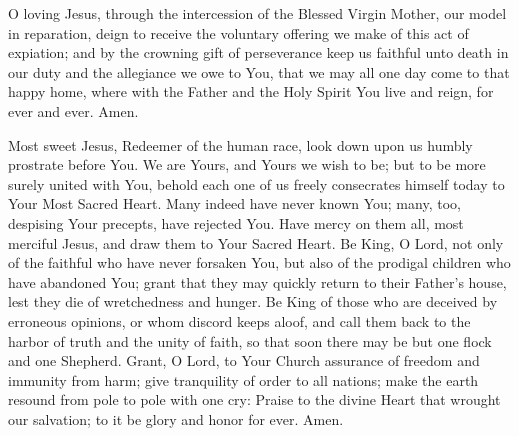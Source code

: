 O loving Jesus, through the intercession of the Blessed Virgin Mother, our model in reparation, deign to receive the voluntary offering we make of this act of expiation;
and by the crowning gift of perseverance keep us faithful unto death in our duty and the allegiance we owe to You, that we may all one day come to that happy home, where with the Father and the Holy Spirit You live and reign, for ever and ever. Amen.

Most sweet Jesus, Redeemer of the human race, look down upon us humbly prostrate before You.
We are Yours, and Yours we wish to be;
but to be more surely united with You, behold each one of us freely consecrates himself today to Your Most Sacred Heart.
Many indeed have never known You;
many, too, despising Your precepts, have rejected You.
Have mercy on them all, most merciful Jesus, and draw them to Your Sacred Heart.
Be King, O Lord, not only of the faithful who have never forsaken You, but also of the prodigal children who have abandoned You;
grant that they may quickly return to their Father's house, lest they die of wretchedness and hunger.
Be King of those who are deceived by erroneous opinions, or whom discord keeps aloof, and call them back to the harbor of truth and the unity of faith, so that soon there may be but one flock and one Shepherd.
Grant, O Lord, to Your Church assurance of freedom and immunity from harm;
give tranquility of order to all nations;
make the earth resound from pole to pole with one cry:
Praise to the divine Heart that wrought our salvation;
to it be glory and honor for ever.
Amen.

\newpage